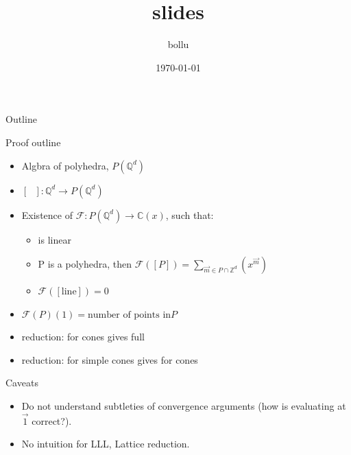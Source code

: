 \documentclass[presentation]{beamer}
\author{bollu}
\date{\today}
\title{slides}
\begin{document}
\maketitle
\begin{frame}{Outline}
\tableofcontents
\end{frame}

\begin{frame}[label=sec-1]{Proof outline}
\begin{itemize}
\item Algbra of polyhedra, $P(\mathbb{Q}^d)$
\item $[\text{ }] : \mathbb{Q}^d \rightarrow P(\mathbb{Q}^d)$
\item Existence of $\mathcal{F}: P(\mathbb{Q}^d) \rightarrow \mathbb{C}(x)$, such that:
\begin{itemize}
\item {} is linear
\item P is a polyhedra, then $\mathcal{F}([P]) = \sum_{\vec{m} \in P \cap \mathbb{Z}^d} (x^{\vec{m}} )$
\item $\mathcal{F}([\text{line}]) = 0$
\end{itemize}
\item $\mathcal{F}(P)(1) = \text{number of points in} P$
\item reduction:  for cones gives full 
\item reduction:  for simple cones gives  for cones
\end{itemize}
\end{frame}


\begin{frame}[label=sec-2]{Caveats}
\begin{itemize}
\item Do not understand subtleties of convergence arguments (how is evaluating at $\vec{1}$ correct?).
\item No intuition for LLL, Lattice reduction.
\end{itemize}
\end{frame}
\end{document}
